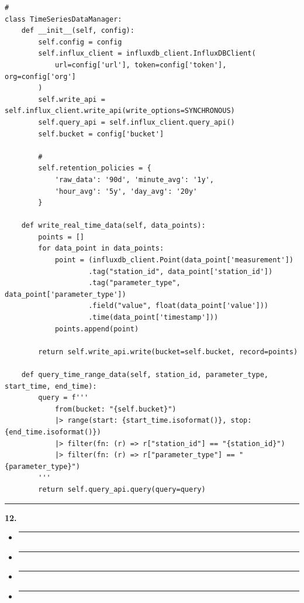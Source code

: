 \begin{verbatim}
# 
class TimeSeriesDataManager:
    def __init__(self, config):
        self.config = config
        self.influx_client = influxdb_client.InfluxDBClient(
            url=config['url'], token=config['token'], org=config['org']
        )
        self.write_api = self.influx_client.write_api(write_options=SYNCHRONOUS)
        self.query_api = self.influx_client.query_api()
        self.bucket = config['bucket']
        
        # 
        self.retention_policies = {
            'raw_data': '90d', 'minute_avg': '1y', 
            'hour_avg': '5y', 'day_avg': '20y'
        }
    
    def write_real_time_data(self, data_points):
        points = []
        for data_point in data_points:
            point = (influxdb_client.Point(data_point['measurement'])
                    .tag("station_id", data_point['station_id'])
                    .tag("parameter_type", data_point['parameter_type'])
                    .field("value", float(data_point['value']))
                    .time(data_point['timestamp']))
            points.append(point)
        
        return self.write_api.write(bucket=self.bucket, record=points)
    
    def query_time_range_data(self, station_id, parameter_type, start_time, end_time):
        query = f'''
            from(bucket: "{self.bucket}")
            |> range(start: {start_time.isoformat()}, stop: {end_time.isoformat()})
            |> filter(fn: (r) => r["station_id"] == "{station_id}")
            |> filter(fn: (r) => r["parameter_type"] == "{parameter_type}")
        '''
        return self.query_api.query(query=query)
\end{verbatim}

\begin{center}\rule{0.5\linewidth}{0.5pt}\end{center}

\textbf{12. }

\begin{itemize}
\item
  \begin{center}\rule{0.5\linewidth}{0.5pt}\end{center}
\item
  \begin{center}\rule{0.5\linewidth}{0.5pt}\end{center}
\item
  \begin{center}\rule{0.5\linewidth}{0.5pt}\end{center}
\item
  \begin{center}\rule{0.5\linewidth}{0.5pt}\end{center}
\end{itemize}

